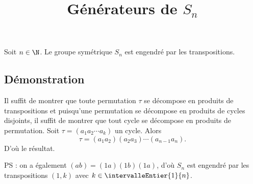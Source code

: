 \documentclass[fontsize=12pt,twoside=false,parskip=half, french]{scrartcl}
\title{Générateurs de $S_n$}
\date{}
\author{}
\begin{document}
\maketitle
   \begin{Theoreme}
      Soit $n \in \N$. Le groupe symétrique $S_n$ est engendré par les transpositions.
   \end{Theoreme}
   \subsection{Démonstration}
      Il suffit de montrer que toute permutation $\tau$ se décompose en produits 
      de transpositions et puisqu’une permutation se décompose en produits de 
      cycles disjoints, il suffit de montrer que tout cycle se décompose en produits
      de permutation. Soit $\tau = (a_1 a_2 \cdots a_k)$ un cycle. Alors
      \[
         \tau = (a_1 a_2) (a_2 a_3) \cdots (a_{n - 1} a_n).
      \]
      D’où le résultat.
      
      PS : on a également $(a b) = (1 a) (1 b) (1 a)$, d’où $S_n$ est engendré 
      par les transpositions $(1, k)$ avec $k \in \intervalleEntier{1}{n}$.
\end{document}
